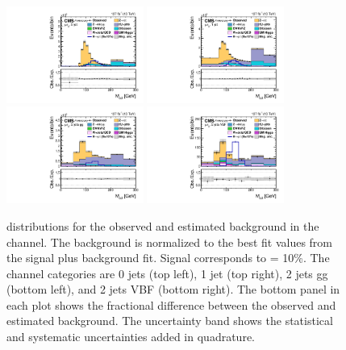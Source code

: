 \begin{figure}[htbp!]
  \centering
  \includegraphics[width=0.4\textwidth]{plots/chapter9/CB/mue/0jet.pdf}
  \includegraphics[width=0.4\textwidth]{plots/chapter9/CB/mue/1jet.pdf} \\
  \includegraphics[width=0.4\textwidth]{plots/chapter9/CB/mue/2jet_gg.pdf}
  \includegraphics[width=0.4\textwidth]{plots/chapter9/CB/mue/2jet_vbf.pdf} \\
  \caption{\mcol distributions for the observed and estimated background in the \mue channel. The background is normalized to the best fit values from the signal plus background fit. Signal corresponds to \BHmt = 10\%. The \mue channel categories are 0 jets (top left), 1 jet (top right), 2 jets gg (bottom left), and 2 jets VBF (bottom right). The bottom panel in each plot shows the fractional difference between the observed and estimated background. The uncertainty band shows the statistical and systematic uncertainties added in quadrature.}
  \label{fig:mcol_mue}
\end{figure}

